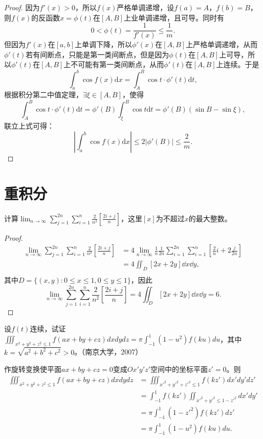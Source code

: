 \begin{proof}
因为$f'(x)>0$，所以$f(x)$严格单调递增，设$f(a)=A$，$f(b)=B$，则$f(x)$的反函数$x=\phi(t)$在$[A,B]$上业单调递增，且可导。同时有$$0<\phi(t)=\frac{1}{f'(x)}\leq\frac{1}{m}.$$
但因为$f'(x)$在$[a,b]$上单调下降，所以$\phi'(x)$在$[A,B]$上严格单调递增，从而$\phi'(t)$若有间断点，只能是第一类间断点，但是因为$\phi(t)$在$[A,B]$上可导，所以$\phi'(t)$在$[A,B]$上不可能有第一类间断点，从而$\phi'(t)$在$[A,B]$上连续。于是
$$\int_a^b\cos f(x)\mathrm{d}x=\int_A^B\cos t\cdot\phi'(t)\mathrm{d}t,$$
根据积分第二中值定理，$\exists\xi\in[A,B]$，使得
$$\int_A^B\cos t\cdot\phi'(t)\mathrm{d}t=\phi'(B)\int_{\xi}^B\cos t\mathrm{d}t=\phi'(B)(\sin B-\sin\xi),$$
联立上式可得：
$$|\int_a^b\cos f(x)\mathrm{d}x|\leq2|\phi'(B)|\leq\frac{2}{m}.$$
\end{proof}

  
\section{重积分}

\begin{exercise}
计算$\displaystyle\lim_{n\rightarrow\infty}\sum_{j=1}^{2n}\sum_{i=1}^n\frac2{n^2}[\frac{2i+j}n]$，这里$[x]$为不超过$x$的最大整数。%
\end{exercise}

\begin{proof}
  \begin{align*}
  \lim_{n\rightarrow\infty}\sum_{j=1}^{2n}\sum_{i=1}^n\frac{2}{n^2}[\frac{2i+j}{n}]&=4\lim_{n\rightarrow\infty}\frac{1}{n}\frac{1}{2n}\sum_{i=1}^{2n}\sum_{i=1}^n[\frac{2}{n}i+2\frac{j}{2n}]\\
  &=4\iint_D[2x+2y]\dd x\dd y,\\
  \end{align*}
  其中$D=\{(x,y):0\leq x\leq1,0\leq y\leq1\}$，因此
  $$\lim_{n\rightarrow\infty}\sum_{j=1}^{2n}\sum_{i=1}^n\frac{2}{n^2}[\frac{2i+j}{n}]=4\iint_D[2x+2y]\dd x\dd y=6.$$
  \end{proof}
  
\begin{exercise}
   设$f(t)$连续，试证$\displaystyle\iiint_{x^2+y^2+z^2\leq1}f(ax+by+cz)dxdydz=\pi\int_{-1}^1(1-u^2)f(ku)du$，其中$k=\sqrt{a^2+b^2+c^2}>0$。（南京大学，2007） 
  
   作旋转变换使平面$ax+by+cz=0$变成$Ox'y'z'$空间中的坐标平面$z'=0$。则
  \begin{align*}
  \iiint_{x^2+y^2+z^2\leq 1}f(ax+by+cz)dxdydz&=\iiint_{x'^2+y'^2+z'^2\leq1}f(kz')dx'dy'dz'\\
  &=\int_{-1}^1f(kz')\iint_{x'^2+y'^2\leq1-z'^2}dx'dy'\\
  &=\pi\int_{-1}^1(1-z'^2)f(kz')dz'\\
  &=\pi\int_{-1}^1(1-u^2)f(ku)du.\\
  \end{align*} 
  \end{exercise}
  
